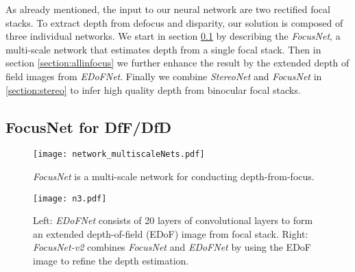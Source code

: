 \documentclass[10pt,twocolumn,letterpaper]{article}
\begin{document}
As already mentioned, the input to our neural network are two rectified focal stacks. To extract depth from defocus and disparity, our solution is composed of three individual networks. We start in section \ref{section:multiscale} by describing the \emph{FocusNet}, a multi-scale network that estimates depth from a single focal stack. Then in section \ref{section:allinfocus} we further enhance the result by the extended depth of field images from \emph{EDoFNet}. Finally we combine \emph{StereoNet} and \emph{FocusNet} in \ref{section:stereo} to infer high quality depth from binocular focal stacks.


\subsection{FocusNet for DfF/DfD}
\label{section:multiscale}

\begin{figure}[t]
\begin{center}
   \texttt{[image: network\_multiscaleNets.pdf]}
\end{center}
\vspace{-8pt}
   \caption{\emph{FocusNet} is a multi-scale network for conducting depth-from-focus.}
\label{fig:network_dfdMultiScale}
\end{figure}

\begin{figure}[t]
\begin{center}
   \texttt{[image: n3.pdf]}
\end{center}
\vspace{-8pt}
   \caption{Left: \emph{EDoFNet} consists of 20 layers of convolutional layers to form an extended depth-of-field (EDoF) image from focal stack. Right: \emph{FocusNet-v2} combines \emph{FocusNet} and \emph{EDoFNet} by using the EDoF image to refine the depth estimation.}
\label{fig:network_allinfocus}
\end{figure}
\end{document}
